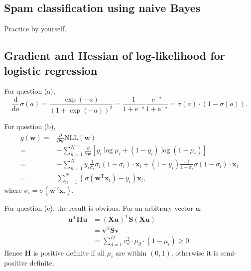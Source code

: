 \documentclass[UTF8]{ctexart}
\begin{document}
\subsection{Spam classification using naive Bayes}
Practice by yourself.

\subsection{Gradient and Hessian of log-likelihood for logistic regression}
For question (a),
$$\frac{\text{d}}{\text{d} a} \sigma(a) = \frac{\exp(-a)}{(1+\exp(-a))^{2}} = \frac{1}{1+\text{e}^{-a}}\frac{\text{e}^{-a}}{1+\text{e}^{-a}}=\sigma(a)\cdot (1-\sigma(a)).$$

For question (b),
\begin{align}
g(\textbf{w})=&\frac{\partial}{\partial \textbf{w}}\text{NLL}(\textbf{w})\nonumber \\
=&-\sum_{n=1}^{N}\frac{\partial}{\partial \textbf{w}} [y_{i}\log \mu_{i} + (1-y_{i})\log (1-\mu_{i})]\nonumber \\
=&-\sum_{n=1}^{N}y_{i}\frac{1}{\sigma_{i}}\sigma_{i}(1-\sigma_{i})\cdot\textbf{x}_{i}+(1-y_{i})\frac{-1}{1-\sigma_{i}}\sigma(1-\sigma_{i})\cdot\textbf{x}_{i}\nonumber \\
=&\sum_{n=1}^{N}(\sigma(\textbf{w}^{\text{T}}\textbf{x}_{i})-y_{i})\textbf{x}_{i},\nonumber
\end{align}
where $\sigma_{i}=\sigma(\textbf{w}^{\text{T}}\textbf{x}_{i})$.

For question (c), the result is obvious.
For an arbitrary vector $\textbf{u}$:
$$
\begin{aligned}
\textbf{u}^{\text{T}}\textbf{H}\textbf{u}&=\left(\textbf{X}\textbf{u}\right)^{\text{T}}\textbf{S}\left(\textbf{X}\textbf{u}\right)\\
&=\textbf{v}^{\text{T}}\textbf{S}\textbf{v}\\
&=\sum_{d=1}^{D}v_{d}^{2}\cdot\mu_{d}\cdot (1-\mu_{i})\geq 0.
\end{aligned}
$$
Hence $\textbf{H}$ is positive definite if all $\mu_{i}$ are within $(0,1)$, otherwise it is semi-positive definite.
\end{document}

